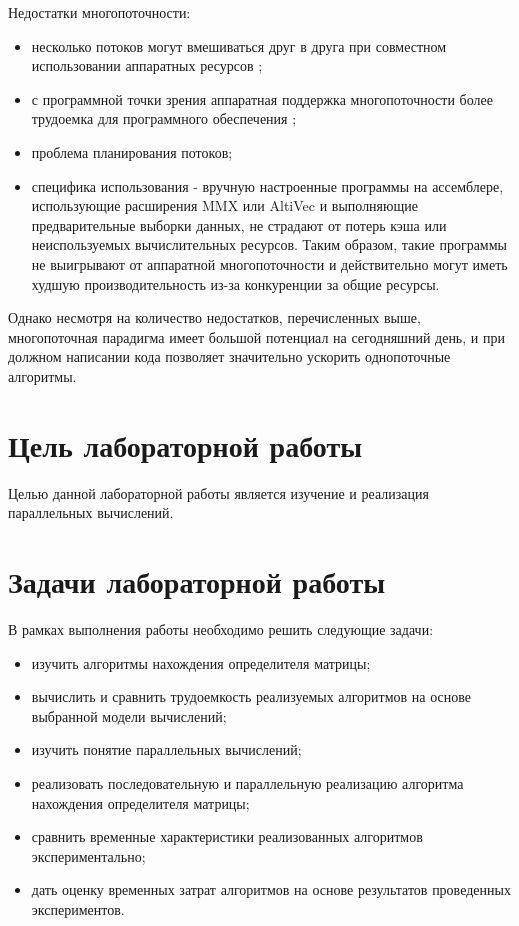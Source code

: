 \documentclass[12pt]{report}
\begin{document}
    Недостатки многопоточности:

    \begin{itemize}
        \item несколько потоков могут вмешиваться друг в друга при совместном
        использовании аппаратных ресурсов \cite{Nemirovsky};
        \item с программной точки зрения аппаратная поддержка многопоточности
        более трудоемка для программного обеспечения \cite{Olukotun};
        \item проблема планирования потоков;
        \item специфика использования - вручную настроенные программы на ассемблере,
        использующие расширения MMX или AltiVec и выполняющие предварительные выборки данных,
        не страдают от потерь кэша или неиспользуемых вычислительных ресурсов.
        Таким образом, такие программы не выигрывают от аппаратной многопоточности
        и действительно могут иметь худшую производительность из-за конкуренции за общие ресурсы.
    \end{itemize}

    Однако несмотря на количество недостатков, перечисленных выше,
    многопоточная парадигма имеет большой потенциал на сегодняшний день,
    и при должном написании кода позволяет значительно ускорить однопоточные алгоритмы.

    \section*{Цель лабораторной работы}
    Целью данной лабораторной работы является изучение и реализация параллельных вычислений.

    \section*{Задачи лабораторной работы}
    В рамках выполнения работы необходимо решить следующие задачи:

    \begin{itemize}
    	\item изучить алгоритмы нахождения определителя матрицы;
    	\item вычислить и сравнить трудоемкость реализуемых алгоритмов на основе выбранной модели вычислений;
        \item изучить понятие параллельных вычислений;
        \item реализовать последовательную и параллельную реализацию алгоритма нахождения определителя матрицы;
        \item сравнить временные характеристики реализованных алгоритмов экспериментально;
        \item дать оценку временных затрат алгоритмов на основе результатов проведенных экспериментов.
    \end{itemize}
\end{document}
